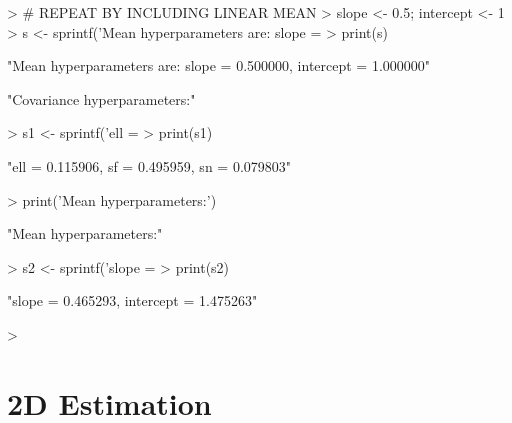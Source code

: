\documentclass[a4paper]{article}
\begin{document}
\begin{Schunk}
\begin{Sinput}
> # REPEAT BY INCLUDING LINEAR MEAN
> slope <- 0.5; intercept <- 1
> s <- sprintf('Mean hyperparameters are: slope = %f, intercept = %f', slope, intercept)
> print(s)
\end{Sinput}
\begin{Soutput}
[1] "Mean hyperparameters are: slope = 0.500000, intercept = 1.000000"
\end{Soutput}
\begin{Soutput}
[1] "Covariance hyperparameters:"
\end{Soutput}
\begin{Sinput}
> s1 <- sprintf('ell = %f, sf = %f, sn = %f', ell_est, sf_est, sn_est)
> print(s1)
\end{Sinput}
\begin{Soutput}
[1] "ell = 0.115906, sf = 0.495959, sn = 0.079803"
\end{Soutput}
\begin{Sinput}
> print('Mean hyperparameters:')
\end{Sinput}
\begin{Soutput}
[1] "Mean hyperparameters:"
\end{Soutput}
\begin{Sinput}
> s2 <- sprintf('slope = %f, intercept = %f', slope_est, intercept_est)
> print(s2)
\end{Sinput}
\begin{Soutput}
[1] "slope = 0.465293, intercept = 1.475263"
\end{Soutput}
\begin{Sinput}
> 
\end{Sinput}
\end{Schunk}
\section{2D Estimation}
\end{document}
